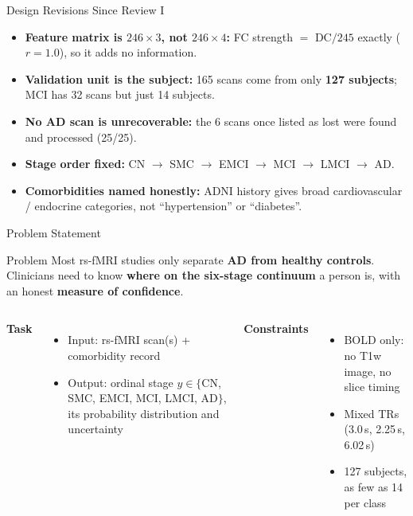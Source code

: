 \documentclass[aspectratio=169,11pt]{beamer}
\begin{document}
\begin{frame}{Design Revisions Since Review I}
  \begin{itemize}
    \item \textbf{Feature matrix is $246\times3$, not $246\times4$:}
          FC strength $=$ DC$/245$ exactly ($r=1.0$), so it adds no information.
    \item \textbf{Validation unit is the subject:} 165 scans come from only
          \textbf{127 subjects}; MCI has 32 scans but just 14 subjects.
    \item \textbf{No AD scan is unrecoverable:} the 6 scans once listed as lost
          were found and processed (25/25).
    \item \textbf{Stage order fixed:} CN $\rightarrow$ SMC $\rightarrow$ EMCI
          $\rightarrow$ MCI $\rightarrow$ LMCI $\rightarrow$ AD.
    \item \textbf{Comorbidities named honestly:} ADNI history gives broad
          cardiovascular / endocrine categories, not ``hypertension'' or ``diabetes''.
  \end{itemize}
\end{frame}

\begin{frame}{Problem Statement}
  \begin{alertblock}{Problem}
    Most rs-fMRI studies only separate \textbf{AD from healthy controls}. Clinicians
    need to know \textbf{where on the six-stage continuum} a person is, with an
    honest \textbf{measure of confidence}.
  \end{alertblock}
  \vspace{0.3cm}
  \begin{columns}[T,onlytextwidth]
      \textbf{Task}
      \begin{itemize}
        \item Input: rs-fMRI scan(s) + comorbidity record
        \item Output: ordinal stage $y \in \{$CN, SMC, EMCI, MCI, LMCI, AD$\}$,
              its probability distribution and uncertainty
      \end{itemize}
      \textbf{Constraints}
      \begin{itemize}
        \item BOLD only: no T1w image, no slice timing
        \item Mixed TRs (3.0\,s, 2.25\,s, 6.02\,s)
        \item 127 subjects, as few as 14 per class
      \end{itemize}
  \end{columns}
\end{frame}
\end{document}
